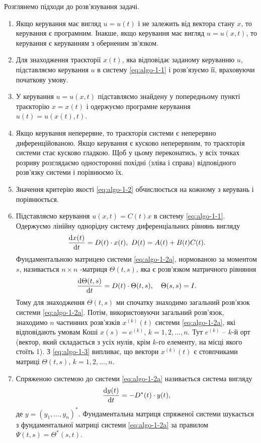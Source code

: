 \begin{algorithm}
    \label{algo-1-1}
	Розглянемо підходи до розв'язування задачі.
	\begin{enumerate}
		\item Якщо керування має вигляд $u = u(t)$ і не залежить від вектора стану $x$, то керування є програмним. Інакше, якщо керування має вигляд $u = u(x, t)$, то  керування  є керуванням з оберненим зв'язком.
		\item Для знаходження траєкторії $x(t)$, яка відповідає заданому керуванню $u$, підставляємо керування $u$ в систему \ref{eq:algo-1-1} і розв'язуємо її, враховуючи початкову умову.
		\item У керування $u = u(x, t)$ підставляємо знайдену у попередньому пункті траєкторію $x = x(t)$ і одержуємо програмне керування $u(t) = u(x(t), t)$.
		\item Якщо керування неперервне, то траєкторія системи є неперервно диференційованою. Якщо керування є  кусково неперервним, то траєкторія системи стає кусково гладкою. Щоб у цьому переконатись, у всіх точках розриву %
		розглядаємо односторонні похідні (зліва і справа) відповідного розв'язку системи і порівнюємо їх. 
		\item Значення критерію якості \eqref{eq:algo-1-2} обчислюється на кожному з керувань і порівнюється.
		\item Підставляємо керування $u(x,t) = C(t)x$ в систему \eqref{eq:algo-1-1}. Одержуємо лінійну однорідну систему диференціальних рівнянь вигляду 
		\begin{equation}
		    \label{eq:algo-1-2a}
		\frac{\mathop{}\!\mathrm{d} x(t)}{\mathop{}\!\mathrm{d} t} = D (t) \cdot x(t), \ D(t) = A(t) + B(t)C(t).
		\end{equation}
		Фундаментальною матрицею системи \eqref{eq:algo-1-2a}, нормованою за моментом $s$, називається  $n \times n$ -матриця $\Theta(t, s)$, яка є розв'язком матричного рівняння \begin{equation}
		    \label{eq:algo-1-3}
		    \frac{\mathop{}\!\mathrm{d} \Theta(t, s)}{\mathop{}\!\mathrm{d} t} = D(t) \cdot \Theta(t, s), \quad \Theta(s, s) = I.
		\end{equation}
		Тому для знаходження $\Theta(t, s)$ ми спочатку знаходимо загальний розв'язок системи \eqref{eq:algo-1-2a}. Потім, використовуючи загальний розв'язок, знаходимо $n$ частинних розв'язків $x^{(k)}(t)$ системи \eqref{eq:algo-1-2a}, які відповідають умовам Коші $x(s) = e^{(k)}$, $k=1,2,\ldots,n$. Тут $e^{(k)}$ -- $k$-й орт (вектор, який складається з усіх нулів, крім $k$-го елементу, на місці якого стоїть 1). З \eqref{eq:algo-1-3} випливає, що вектори $x^{(k)}(t)$ є стовпчиками матриці $\Theta(t, s)$, $k=1,2,\ldots,n$. 
		\item Спряженою системою до системи \eqref{eq:algo-1-2a} називається система вигляду
		\begin{equation}
		    \label{eq:algo-1-4}
		    \frac{\mathop{}\!\mathrm{d} y(t)}{\mathop{}\!\mathrm{d} t} = - D^*(t) \cdot y(t),
		\end{equation}
		де $y = (y_1, \ldots, y_n)^*$. Фундаментальна матриця спряженої системи шукається з фундаментальної матриці системи \eqref{eq:algo-1-2a} за правилом $\Psi(t,s) = \Theta^*(s,t)$.
	\end{enumerate}
\end{algorithm}

